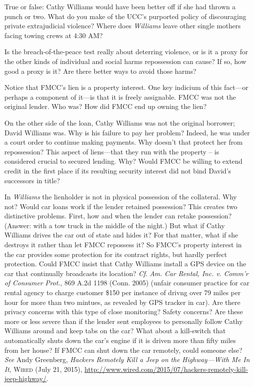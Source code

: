 
\item True or false: Cathy Williams would have been better off if she had thrown
a punch or two. What do you make of the UCC's purported policy of discouraging
private extrajudicial violence? Where does \textit{Williams} leave other single
mothers facing towing crews at 4:30 AM?


\item Is the breach-of-the-peace test really about deterring violence, or is it
a proxy for the other kinds of individual and social harms repossession can
cause? If so, how good a proxy is it? Are there better ways to avoid those
harms?


\item Notice that FMCC's lien is a property interest. One key indicium of this
fact---or perhaps a component of it---is that it is freely assignable. FMCC
was not the original lender. Who was? How did FMCC end up owning the lien? 


\item On the other side of the loan, Cathy Williams was not the original
borrower; David Williams was. Why is his failure to pay her problem? Indeed, he
was under a court order to continue making payments. Why doesn't that protect
her from repossession? This aspect of liens---that they run with the property
-- is considered crucial to secured lending. Why? Would FMCC be willing to
extend credit in the first place if its resulting security interest did not
bind David's successors in title?


\item In \textit{Williams} the lienholder is not in physical possession of the
collateral. Why not? Would car loans work if the lender retained possession?
This creates two distinctive problems. First, how and when the lender can
retake possession? (Answer: with a tow truck in the middle of the night.) But
what if Cathy Williams drives the car out of state and hides it? For that
matter, what if she destroys it rather than let FMCC repossess it? So FMCC's
property interest in the car provides some protection for its contract rights,
but hardly perfect protection. Could FMCC insist that Cathy Williams install a
GPS device on the car that continually broadcasts its location? \textit{Cf}.
\emph{Am. Car Rental, Inc. v. Comm'r of Consumer Prot.}, 869 A.2d 1198
(Conn. 2005) (unfair consumer practice for car rental agency to charge customer
\$150 per instance of drivng over 79 miles per hour for more than two mintues,
as revealed by GPS tracker in car). Are there privacy concerns with this type
of close monitoring? Safety concerns? Are these more or less severe than if the
lender sent employees to personally follow Cathy Williams around and keep tabs
on the car? What about a kill-switch that automatically shuts down the car's
engine if it is driven more than fifty miles from her house? If FMCC can shut
down the car remotely, could someone else? \textit{See} Andy Greenberg,
\textit{Hackers Remotely Kill a Jeep on the Highway---With Me In It},
\textsc{Wired} (July 21, 2015),
\url{http://www.wired.com/2015/07/hackers-remotely-kill-jeep-highway/}.


